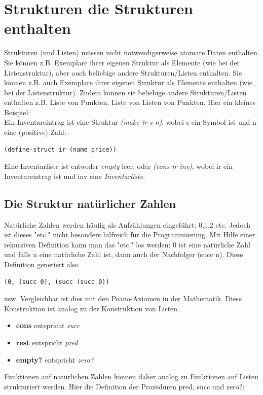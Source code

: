 \section{Strukturen die Strukturen enthalten}
Strukturen (und Listen) müssen nicht notwendigerweise atomare Daten enthalten. Sie können z.B. Exemplare ihrer eigenen Struktur als Elemente (wie bei der Listenstruktur), aber auch beliebige andere Strukturen/Listen enthalten. Sie können z.B. auch Exemplare ihrer eigenen Struktur als Elemente enthalten (wie bei der Listenstruktur). Zudem können sie beliebige andere Strukturen/Listen enthalten z.B. Liste von Punkten, Liste von Listen von Punkten. Hier ein kleines Beispiel:\\

Ein Inventareintrag ist eine Struktur \textit{(make-ir s n)}, wobei s ein Symbol ist und n eine (positive) Zahl:
\begin{lstlisting}
(define-struct ir (name price))
\end{lstlisting}
Eine Inventarliste ist entweder \textit{empty} leer, oder \textit{(cons ir inv)}, wobei ir ein Inventareintrag ist und inv eine \textit{Inventarliste}.

\subsection{Die Struktur natürlicher Zahlen}
Natürliche Zahlen werden häufig als Aufzählungen eingeführt: 0,1,2 etc. Jedoch ist dieses "etc." nicht besonders hilfreich für die Programmierung. Mit Hilfe einer rekursiven Definition kann man das "etc." los werden:
0 ist eine natürliche Zahl und falls n eine natürliche Zahl ist, dann auch der Nachfolger (succ n). Diese Definition generiert also
\begin{lstlisting}
(0, (succ 0), (succ (succ 0))
\end{lstlisting}
usw. Vergleichbar ist dies mit den Peano-Axiomen in der Mathematik. Diese Konstruktion ist analog zu der Konstruktion von Listen.

\begin{itemize}
	\item \textbf{cons} entspricht \textit{succ}
	\item \textbf{rest} entspricht \textit{pred}
	\item \textbf{empty?} entspricht \textit{zero?}
\end{itemize}
Funktionen auf natürlichen Zahlen können daher analog zu Funktionen auf Listen strukturiert werden. Hier die Definition der Prozeduren pred, succ und zero?:

